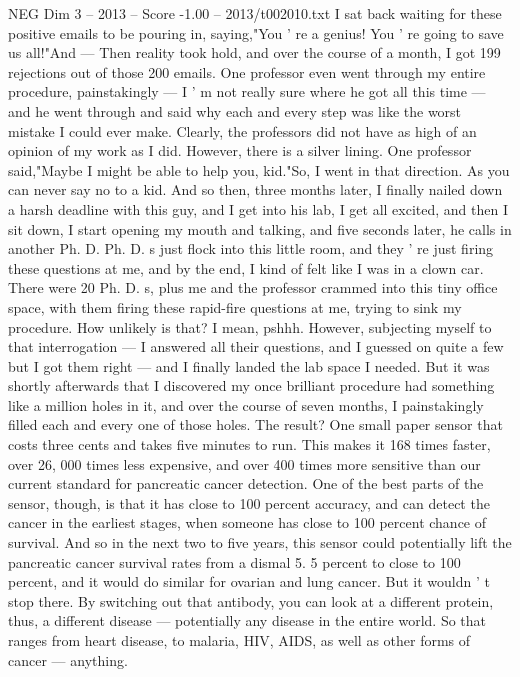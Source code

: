 \begin{textsample}{NEG Dim 3 – 2013 – Score -1.00 – 2013/t002010.txt}
I sat back waiting for these positive emails to be pouring in, saying,"You ' re a genius!
You ' re going to save us all!"And — Then reality took hold, and over the course of a month, I got 199 rejections out of those 200 emails.
One professor even went through my entire procedure, painstakingly — I ' m not really sure where he got all this time — and he went through and said why each and every step was like the worst mistake I could ever make.
Clearly, the professors did not have as high of an opinion of my work as I did.
However, there is a silver lining.
One professor said,"Maybe I might be able to help you, kid."So, I went in that direction.
As you can never say no to a kid.
And so then, three months later, I finally nailed down a harsh deadline with this guy, and I get into his lab, I get all excited, and then I sit down, I start opening my mouth and talking, and five seconds later, he calls in another Ph.
D.
Ph.
D. s just flock into this little room, and they ' re just firing these questions at me, and by the end, I kind of felt like I was in a clown car.
There were 20 Ph.
D. s, plus me and the professor crammed into this tiny office space, with them firing these rapid-fire questions at me, trying to sink my procedure.
How unlikely is that?
I mean, pshhh.
However, subjecting myself to that interrogation — I answered all their questions, and I guessed on quite a few but I got them right — and I finally landed the lab space I needed.
But it was shortly afterwards that I discovered my once brilliant procedure had something like a million holes in it, and over the course of seven months, I painstakingly filled each and every one of those holes.
The result?
One small paper sensor that costs three cents and takes five minutes to run.
This makes it 168 times faster, over 26, 000 times less expensive, and over 400 times more sensitive than our current standard for pancreatic cancer detection.
One of the best parts of the sensor, though, is that it has close to 100 percent accuracy, and can detect the cancer in the earliest stages, when someone has close to 100 percent chance of survival.
And so in the next two to five years, this sensor could potentially lift the pancreatic cancer survival rates from a dismal 5. 5 percent to close to 100 percent, and it would do similar for ovarian and lung cancer.
But it wouldn ' t stop there.
By switching out that antibody, you can look at a different protein, thus, a different disease — potentially any disease in the entire world.
So that ranges from heart disease, to malaria, HIV, AIDS, as well as other forms of cancer — anything.

\end{textsample}
